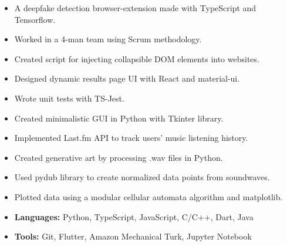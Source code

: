 \begin{itemize}
\item A deepfake detection browser-extension made with TypeScript and Tensorflow.
\item Worked in a 4-man team using Scrum methodology.
\item Created script for injecting collapsible DOM elements into websites.
\item Designed dynamic results page UI with React and material-ui.
\item Wrote unit tests with TS-Jest.
\end{itemize}


\begin{itemize}
\item Created minimalistic GUI in Python with Tkinter library.
\item Implemented Last.fm API to track users’ music listening history.
\end{itemize}


\begin{itemize}
\item Created generative art by processing .wav files in Python.
\item Used pydub library to create normalized data points from soundwaves.
\item Plotted data using a modular cellular automata algorithm and matplotlib.
\end{itemize}

\begin{itemize}
    \item \textbf{Languages:} Python, TypeScript, JavaScript, C/C++, Dart, Java
    \item \textbf{Tools:} Git, Flutter, Amazon Mechanical Turk, Jupyter Notebook
\end{itemize}